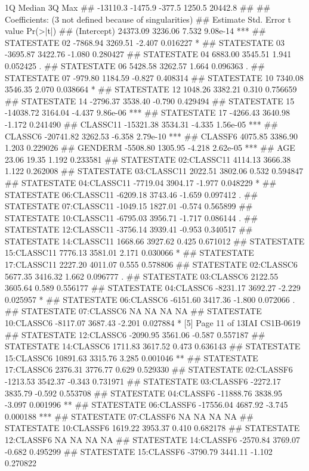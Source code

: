\documentclass[a4paper,12pt]{article}
\begin{document}
1Q Median
3Q Max
## -13110.3 -1475.9 -377.5 1250.5 20442.8
##
## Coefficients: (3 not defined because of singularities)
##
Estimate Std. Error t value Pr(>|t|)
## (Intercept)
24373.09 3236.06 7.532 9.08e-14 ***
## STATESTATE 02
-7868.94 3269.51 -2.407 0.016227 *
## STATESTATE 03
-3695.87 3422.76 -1.080 0.280427
## STATESTATE 04
6883.00 3545.51 1.941 0.052425 .
## STATESTATE 06
5428.58 3262.57 1.664 0.096363 .
## STATESTATE 07
-979.80 1184.59 -0.827 0.408314
## STATESTATE 10
7340.08 3546.35 2.070 0.038664 *
## STATESTATE 12
1048.26 3382.21 0.310 0.756659
## STATESTATE 14
-2796.37 3538.40 -0.790 0.429494
## STATESTATE 15
-14038.72 3164.04 -4.437 9.86e-06 ***
## STATESTATE 17
-4266.43 3640.98 -1.172 0.241490
## CLASSC11
-15321.38 3534.31 -4.335 1.56e-05 ***
## CLASSC6
-20741.82 3262.53 -6.358 2.79e-10 ***
## CLASSF6
4075.85 3386.90 1.203 0.229026
## GENDERM
-5508.80 1305.95 -4.218 2.62e-05 ***
## AGE
23.06 19.35 1.192 0.233581
## STATESTATE 02:CLASSC11 4114.13 3666.38 1.122 0.262008
## STATESTATE 03:CLASSC11 2022.51 3802.06 0.532 0.594847
## STATESTATE 04:CLASSC11 -7719.04 3904.17 -1.977 0.048229 *
## STATESTATE 06:CLASSC11 -6209.18 3743.46 -1.659 0.097412 .
## STATESTATE 07:CLASSC11 -1049.15 1827.01 -0.574 0.565899
## STATESTATE 10:CLASSC11 -6795.03 3956.71 -1.717 0.086144 .
## STATESTATE 12:CLASSC11 -3756.14 3939.41 -0.953 0.340517
## STATESTATE 14:CLASSC11 1668.66 3927.62 0.425 0.671012
## STATESTATE 15:CLASSC11 7776.13 3581.01 2.171 0.030066 *
## STATESTATE 17:CLASSC11 2227.20 4011.07 0.555 0.578806
## STATESTATE 02:CLASSC6 5677.35 3416.32 1.662 0.096777 .
## STATESTATE 03:CLASSC6 2122.55 3605.64 0.589 0.556177
## STATESTATE 04:CLASSC6 -8231.17 3692.27 -2.229 0.025957 *
## STATESTATE 06:CLASSC6 -6151.60 3417.36 -1.800 0.072066 .
## STATESTATE 07:CLASSC6
NA
NA NA
NA
## STATESTATE 10:CLASSC6 -8117.07 3687.43 -2.201 0.027884 *
[5]
Page 11 of 13IAI
CS1B-0619
## STATESTATE 12:CLASSC6 -2090.95 3561.06 -0.587 0.557187
## STATESTATE 14:CLASSC6 1711.83 3617.52 0.473 0.636143
## STATESTATE 15:CLASSC6 10891.63 3315.76 3.285 0.001046 **
## STATESTATE 17:CLASSC6 2376.31 3776.77 0.629 0.529330
## STATESTATE 02:CLASSF6 -1213.53 3542.37 -0.343 0.731971
## STATESTATE 03:CLASSF6 -2272.17 3835.79 -0.592 0.553708
## STATESTATE 04:CLASSF6 -11888.76 3838.95 -3.097 0.001996 **
## STATESTATE 06:CLASSF6 -17556.04 4687.92 -3.745 0.000188 ***
## STATESTATE 07:CLASSF6
NA
NA NA
NA
## STATESTATE 10:CLASSF6 1619.22 3953.37 0.410 0.682178
## STATESTATE 12:CLASSF6
NA
NA NA
NA
## STATESTATE 14:CLASSF6 -2570.84 3769.07 -0.682 0.495299
## STATESTATE 15:CLASSF6 -3790.79 3441.11 -1.102 0.270822
\end{document}
